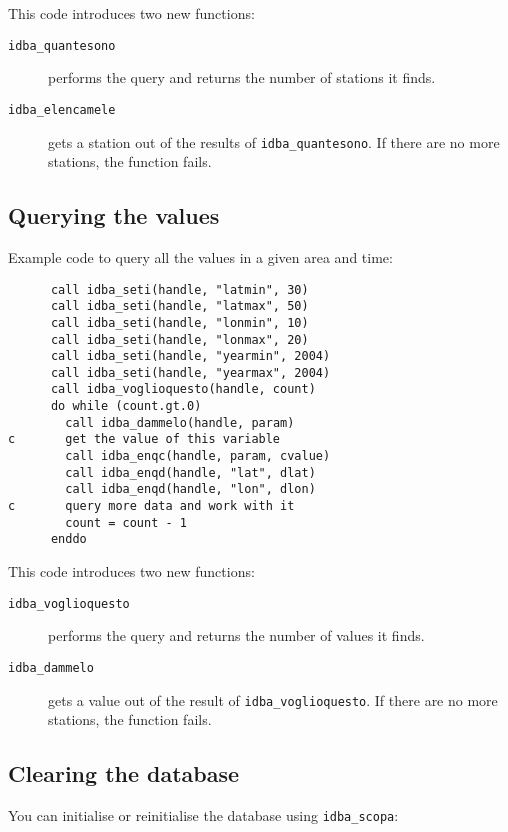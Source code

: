 \documentclass[draft,12pt,a4paper,twoside]{book}
\begin{document}
This code introduces two new functions:

\begin{description}
\item[{\tt idba\_quantesono}]
  performs the query and returns the number of stations it finds.

\item[{\tt idba\_elencamele}]
  gets a station out of the results of {\tt idba\_quantesono}.  If there are no
  more stations, the function fails.
\end{description}

\subsection {Querying the values}

Example code to query all the values in a given area and time:
\label{fun-idba_voglioquesto}
\label{fun-idba_dammelo}

\begin{verbatim}
      call idba_seti(handle, "latmin", 30)
      call idba_seti(handle, "latmax", 50)
      call idba_seti(handle, "lonmin", 10)
      call idba_seti(handle, "lonmax", 20)
      call idba_seti(handle, "yearmin", 2004)
      call idba_seti(handle, "yearmax", 2004)
      call idba_voglioquesto(handle, count)
      do while (count.gt.0)
        call idba_dammelo(handle, param)
c       get the value of this variable
        call idba_enqc(handle, param, cvalue)
        call idba_enqd(handle, "lat", dlat)
        call idba_enqd(handle, "lon", dlon)
c       query more data and work with it
        count = count - 1
      enddo
\end{verbatim}
   
This code introduces two new functions:

\begin{description}
\item[{\tt idba\_voglioquesto}]
  performs the query and returns the number of values it finds.
\item[{\tt idba\_dammelo}]
  gets a value out of the result of {\tt idba\_voglioquesto}.  If there are no
  more stations, the function fails.
\end{description}

\subsection {Clearing the database}

You can initialise or reinitialise the database using {\tt idba\_scopa}:
\label{fun-idba_scopa}
\end{document}
